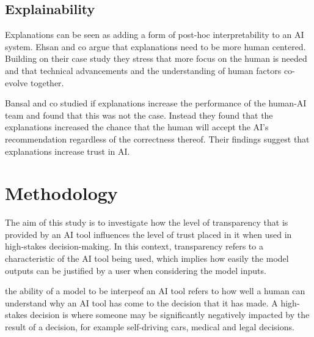 \documentclass[manuscript,screen,review]{acmart}
\begin{document}
\subsection{Explainability}\label{subsec:explainability}
Explanations can be seen as adding a form of post-hoc interpretability to an AI system.
Ehsan and co argue that explanations need to be more human centered.
Building on their case study they stress that more focus on the human is needed and that technical advancements and the understanding of human factors co-evolve together.\cite{Ehsan2020}

Bansal and co studied if explanations increase the performance of the human-AI team and found that this was not the case.
Instead they found that the explanations increased the chance that the human will accept the AI's recommendation regardless of
the correctness thereof.
Their findings suggest that explanations increase trust in AI.\cite{Bansal2020}

\section{Methodology}\label{sec:methodology}


The aim of this study is to investigate how the level of transparency that is provided by an AI tool influences the level of trust placed in it when used in high-stakes decision-making. In this context, transparency refers to a characteristic of the AI tool being used, which implies how easily the model outputs can be justified by a user when considering the model inputs.

the ability of a model to be interpeof an AI tool refers to how well a human can understand why an AI tool has come to the decision that it has made. A high-stakes decision is where someone may be significantly negatively impacted by the result of a decision, for example self-driving cars, medical and legal decisions.
\end{document}

